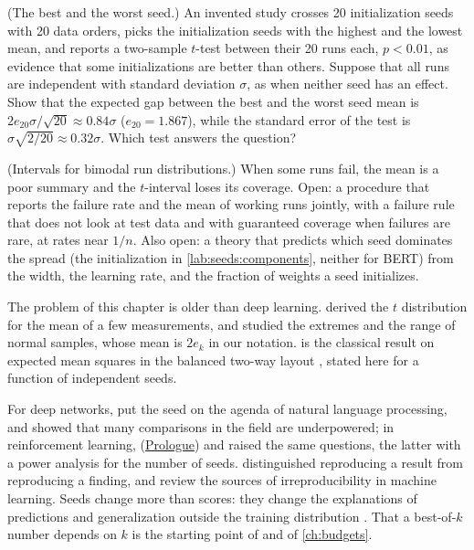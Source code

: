 \begin{refsection}
\begin{exercises}
\item \critique (The best and the worst seed.) An invented study crosses 20 initialization seeds with 20 data orders, picks the initialization seeds with the highest and the lowest mean, and reports a two-sample $t$-test between their 20 runs each, $p<0.01$, as evidence that some initializations are better than others. Suppose that all runs are independent with standard deviation $\sigma$, as when neither seed has an effect. Show that the expected gap between the best and the worst seed mean is $2e_{20}\sigma/\sqrt{20}\approx0.84\sigma$ ($e_{20}=1.867$), while the standard error of the test is $\sigma\sqrt{2/20}\approx0.32\sigma$. Which test answers the question?\label{ex:seeds:critique2}

\item \research (Intervals for bimodal run distributions.) When some runs fail, the mean is a poor summary and the $t$-interval loses its coverage. Open: a procedure that reports the failure rate and the mean of working runs jointly, with a failure rule that does not look at test data and with guaranteed coverage when failures are rare, at rates near $1/n$. Also open: a theory that predicts which seed dominates the spread (the initialization in \cref{lab:seeds:components}, neither for BERT) from the width, the learning rate, and the fraction of weights a seed initializes.\label{ex:seeds:bimodal}
\end{exercises}

\notesandrefs
The problem of this chapter is older than deep learning. \Textcite{Student1908} derived the $t$ distribution for the mean of a few measurements, and \textcite{Tippett1925} studied the extremes and the range of normal samples, whose mean is $2e_k$ in our notation.  is the classical result on expected mean squares in the balanced two-way layout \parencite{SearleEtAl1992}, stated here for a function of independent seeds.

For deep networks, \textcite{ReimersGurevych2017} put the seed on the agenda of natural language processing, and \textcite{CardEtAl2020} showed that many comparisons in the field are underpowered; in reinforcement learning, \textcite{HendersonEtAl2018} (\hyperref[ch:prologue]{Prologue}) and \textcite{ColasEtAl2018} raised the same questions, the latter with a power analysis for the number of seeds. \Textcite{BouthillierEtAl2019} distinguished reproducing a result from reproducing a finding, and \textcite{GundersenEtAl2022} review the sources of irreproducibility in machine learning. Seeds change more than scores: they change the explanations of predictions \parencite{MadhyasthaJain2019} and generalization outside the training distribution \parencite{McCoyEtAl2020}. That a best-of-$k$ number depends on $k$ is the starting point of \textcite{DodgeEtAl2019} and of \cref{ch:budgets}.


\end{refsection}

